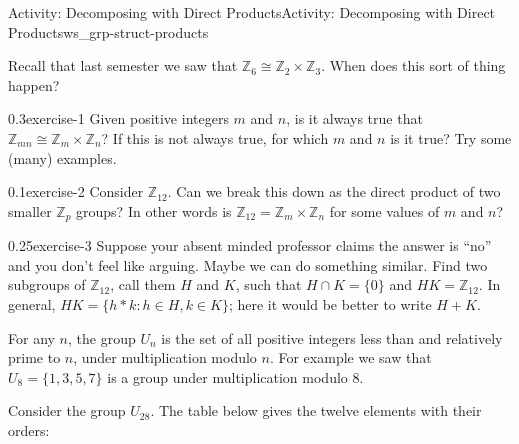 \documentclass[oneside,11pt,]{article}
\title{}
\date{}
\newcommand{\Z}{\mathbb{Z}}
\newcommand{\st}{:}
\begin{document}
%
%
\typeout{************************************************}
\typeout{************************************************}
%
\begin{worksheet-section-numberless}{Activity: Decomposing with Direct Products}{}{Activity: Decomposing with Direct Products}{}{}{ws_grp-struct-products}
\begin{introduction}{}%
\hypertarget{p-1}{}%
Recall that last semester we saw that \(\Z_6 \cong \Z_2\times \Z_3\).  When does this sort of thing happen?%
\end{introduction}%
\begin{divisionexercise}{1}{}{0.3}{exercise-1}%
\hypertarget{p-2}{}%
Given positive integers \(m\) and \(n\), is it always true that \(\Z_{mn} \cong \Z_m\times \Z_n\)?   If this is not always true, for which \(m\) and \(n\) is it true?  Try some (many) examples.%
\end{divisionexercise}%
\begin{divisionexercise}{2}{}{0.1}{exercise-2}%
\hypertarget{p-5}{}%
Consider \(\Z_{12}\).  Can we break this down as the direct product of two smaller \(\Z_p\) groups?  In other words is \(\Z_{12} = \Z_m \times \Z_n\) for some values of \(m\) and \(n\)?%
\end{divisionexercise}%
\begin{divisionexercise}{3}{}{0.25}{exercise-3}%
\hypertarget{p-7}{}%
Suppose your absent minded professor claims the answer is ``no'' and you don't feel like arguing.   Maybe we can do something similar.  Find two subgroups of \(\Z_{12}\), call them \(H\) and \(K\), such that \(H \cap K = \{0\}\) and \(HK = \Z_{12}\).  In general, \(HK = \{h\ast k \st h \in H, k \in K\}\); here it would be better to write \(H+K\).%
\end{divisionexercise}%
\clearpage
\hypertarget{p-10}{}%
For any \(n\), the group \(U_n\) is the set of all positive integers less than and relatively prime to \(n\), under multiplication modulo \(n\).  For example we saw that \(U_8 = \{1,3, 5, 7\}\)  is a group under multiplication modulo 8.%
\par
\hypertarget{p-11}{}%
Consider the group \(U_{28}\).  The table below gives the twelve elements with their orders: \begin{sidebyside}{1}{0}{0}{0}%
\begin{sbspanel}{1}%

\end{sbspanel}
\end{sidebyside}
\end{worksheet-section-numberless}
\end{document}
